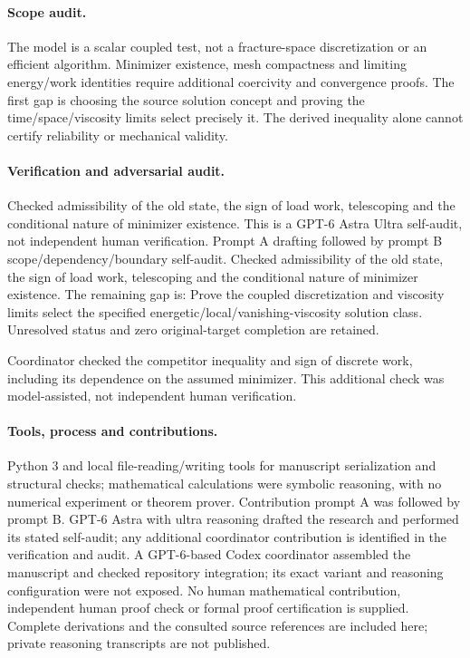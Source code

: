 \documentclass[11pt]{article}
\begin{document}
\paragraph{Scope audit.} The model is a scalar coupled test, not a fracture-space discretization or an efficient algorithm. Minimizer existence, mesh compactness and limiting energy/work identities require additional coercivity and convergence proofs. The first gap is choosing the source solution concept and proving the time/space/viscosity limits select precisely it. The derived inequality alone cannot certify reliability or mechanical validity.

\paragraph{Verification and adversarial audit.}
Checked admissibility of the old state, the sign of load work, telescoping and the conditional nature of minimizer existence. This is a GPT-6 Astra Ultra self-audit, not independent human verification. Prompt A drafting followed by prompt B scope/dependency/boundary self-audit. Checked admissibility of the old state, the sign of load work, telescoping and the conditional nature of minimizer existence. The remaining gap is: Prove the coupled discretization and viscosity limits select the specified energetic/local/vanishing-viscosity solution class. Unresolved status and zero original-target completion are retained.

Coordinator checked the competitor inequality and sign of discrete work, including its dependence on the assumed minimizer. This additional check was model-assisted, not independent human verification.

\paragraph{Tools, process and contributions.}
Python 3 and local file-reading/writing tools for manuscript serialization and structural checks; mathematical calculations were symbolic reasoning, with no numerical experiment or theorem prover. Contribution prompt A was followed by prompt B. GPT-6 Astra with ultra reasoning drafted the research and performed its stated self-audit; any additional coordinator contribution is identified in the verification and audit. A GPT-6-based Codex coordinator assembled the manuscript and checked repository integration; its exact variant and reasoning configuration were not exposed. No human mathematical contribution, independent human proof check or formal proof certification is supplied. Complete derivations and the consulted source references are included here; private reasoning transcripts are not published.
\end{document}
